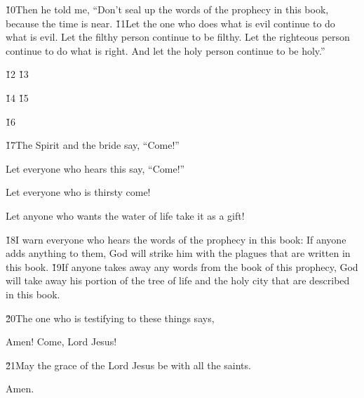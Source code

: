 \v{10}Then he told me, ``Don't seal up the words of the prophecy in this book, because the time is near. \v{11}Let the one who does what is evil continue to do what is evil. Let the filthy person continue to be filthy. Let the righteous person continue to do what is right. And let the holy person continue to be holy.''

\v{12} \v{13}

\v{14} \v{15}

\v{16}

\v{17}The Spirit and the bride say, ``Come!''

Let everyone who hears this say, ``Come!''

Let everyone who is thirsty come!

Let anyone who wants the water of life take it as a gift!

\v{18}I warn everyone who hears the words of the prophecy in this book: If anyone adds anything to them, God will strike him with the plagues that are written in this book. \v{19}If anyone takes away any words from the book of this prophecy, God will take away his portion of the tree of life and the holy city that are described in this book.

\v{20}The one who is testifying to these things says, 

Amen! Come, Lord Jesus!

\v{21}May the grace of the Lord Jesus be with all the saints.

Amen.
